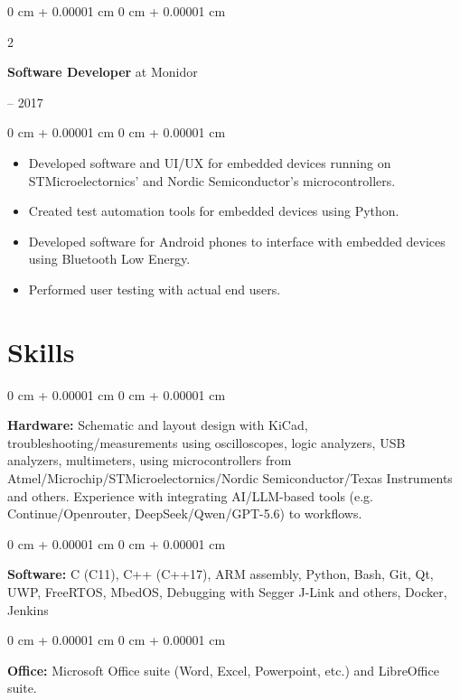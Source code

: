 \documentclass{article}
\newenvironment{highlights}{
    \begin{itemize}[
        topsep=0.10 cm,
        parsep=0.10 cm,
        partopsep=0pt,
        itemsep=0pt,
        leftmargin=0 cm + 10pt
    ]
}{
    \end{itemize}
}
\newenvironment{onecolentry}{
    \begin{adjustwidth}{
        0 cm + 0.00001 cm
    }{
        0 cm + 0.00001 cm
    }
}{
    \end{adjustwidth}
}
\newenvironment{twocolentry}[2][]{
    \onecolentry
    \def\secondColumn{#2}
    \setcolumnwidth{\fill, 4.5 cm}
    \begin{paracol}{2}
}{
    \switchcolumn \raggedleft \secondColumn
    \end{paracol}
    \endonecolentry
}
\begin{document}
    \vspace{0.3 cm}
    \begin{twocolentry}{2016 -- 2017}
      \textbf{Software Developer} at Monidor
    \end{twocolentry}
    \vspace{0.1 cm}
    \begin{onecolentry}
      \begin{highlights}
        \item Developed software and UI/UX for embedded devices running on STMicroelectornics' and Nordic Semiconductor's microcontrollers.
        \item Created test automation tools for embedded devices using Python.
        \item Developed software for Android phones to interface with embedded devices using Bluetooth Low Energy.
        \item Performed user testing with actual end users.
      \end{highlights}
    \end{onecolentry}
  \section{Skills}
    \begin{onecolentry}
      \textbf{Hardware:} Schematic and layout design with KiCad, troubleshooting/measurements using oscilloscopes, logic analyzers, USB analyzers, multimeters, using microcontrollers from Atmel/Microchip/STMicroelectornics/Nordic Semiconductor/Texas Instruments and others. Experience with integrating AI/LLM-based tools (e.g. Continue/Openrouter, DeepSeek/Qwen/GPT-5.6) to workflows.
    \end{onecolentry}
    \vspace{0.3 cm}
    \begin{onecolentry}
      \textbf{Software:} C (C11), C++ (C++17), ARM assembly, Python, Bash, Git, Qt, UWP, FreeRTOS, MbedOS, Debugging with Segger J-Link and others, Docker, Jenkins
    \end{onecolentry}
    \vspace{0.3 cm}
    \begin{onecolentry}
      \textbf{Office:} Microsoft Office suite (Word, Excel, Powerpoint, etc.) and LibreOffice suite.
    \end{onecolentry}
  \newpage
\end{document}

